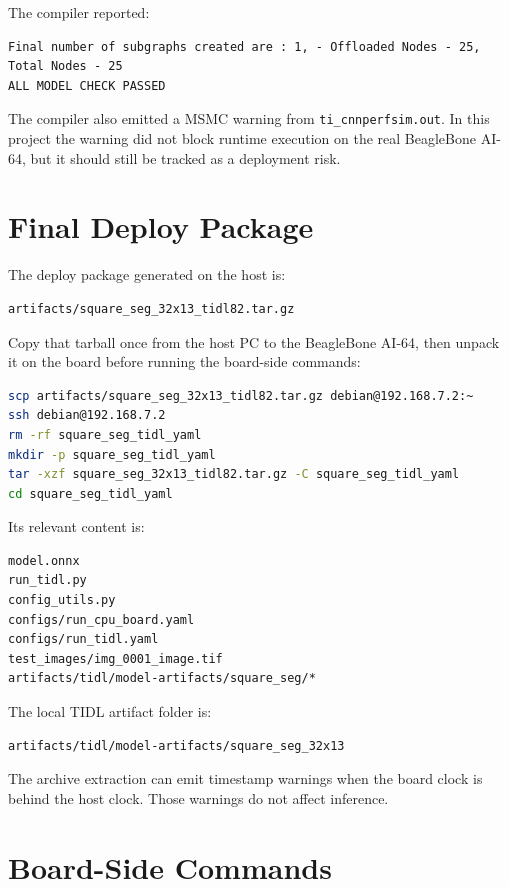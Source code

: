 \documentclass[11pt,a4paper]{article}
\begin{document}
The compiler reported:

\begin{lstlisting}
Final number of subgraphs created are : 1, - Offloaded Nodes - 25, Total Nodes - 25
ALL MODEL CHECK PASSED
\end{lstlisting}

The compiler also emitted a MSMC warning from \texttt{ti\_cnnperfsim.out}.  In this project the warning did not block runtime execution on the real BeagleBone AI-64, but it should still be tracked as a deployment risk.

\section{Final Deploy Package}

The deploy package generated on the host is:

\begin{lstlisting}
artifacts/square_seg_32x13_tidl82.tar.gz
\end{lstlisting}

Copy that tarball once from the host PC to the BeagleBone AI-64, then unpack it on the board before running the board-side commands:

\begin{lstlisting}[language=bash]
scp artifacts/square_seg_32x13_tidl82.tar.gz debian@192.168.7.2:~
ssh debian@192.168.7.2
rm -rf square_seg_tidl_yaml
mkdir -p square_seg_tidl_yaml
tar -xzf square_seg_32x13_tidl82.tar.gz -C square_seg_tidl_yaml
cd square_seg_tidl_yaml
\end{lstlisting}

Its relevant content is:

\begin{lstlisting}
model.onnx
run_tidl.py
config_utils.py
configs/run_cpu_board.yaml
configs/run_tidl.yaml
test_images/img_0001_image.tif
artifacts/tidl/model-artifacts/square_seg/*
\end{lstlisting}

The local TIDL artifact folder is:

\begin{lstlisting}
artifacts/tidl/model-artifacts/square_seg_32x13
\end{lstlisting}

The archive extraction can emit timestamp warnings when the board clock is behind the host clock.  Those warnings do not affect inference.

\section{Board-Side Commands}
\end{document}
